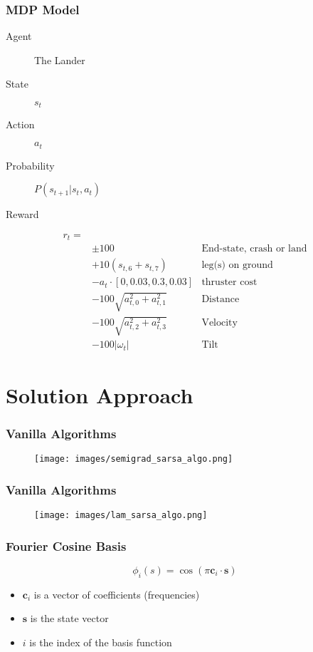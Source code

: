 \documentclass{beamer}
\begin{document}
\begin{frame}
    \frametitle{MDP Model}
    \begin{description}
        \item[Agent] The Lander
        \item[State] \(s_t\)
        \item[Action] \(a_t\)
        \item[Probability] \(P(s_{t+1}|s_t,a_t)\)
        \item[Reward] 
    \end{description}
    \begin{align*}
        r_t = \\
        & \pm 100                   & \text{End-state, crash or land} \\
        & +10 (s_{t,6} + s_{t,7})   & \text{leg(s) on ground} \\
        & -a_t\cdot [0,0.03,0.3,0.03] & \text{thruster cost} \\
        & - 100\sqrt{a_{t,0}^2+a_{t,1}^2} & \text{Distance} \\
        & - 100\sqrt{a_{t,2}^2+a_{t,3}^2} & \text{Velocity} \\
        & - 100|\omega_t| & \text{Tilt}
    \end{align*}
\end{frame}

\section{Solution Approach}

\begin{frame}
    \frametitle{Vanilla Algorithms}
    \begin{figure}
        \texttt{[image: images/semigrad\_sarsa\_algo.png]}
    \end{figure}
\end{frame}

\begin{frame}
    \frametitle{Vanilla Algorithms}
    \begin{figure}
        \texttt{[image: images/lam\_sarsa\_algo.png]}
    \end{figure}
\end{frame}

\begin{frame}
    \frametitle{Fourier Cosine Basis}
    \[ \phi_i(s)=\cos(\pi\mathbf{c}_i\cdot\mathbf{s}) \]
    \begin{itemize}
        \item \(\mathbf{c}_i\) is a vector of coefficients (frequencies)
        \item \(\mathbf{s}\) is the state vector
        \item \(i\) is the index of the basis function
    \end{itemize}
\end{frame}
\end{document}
